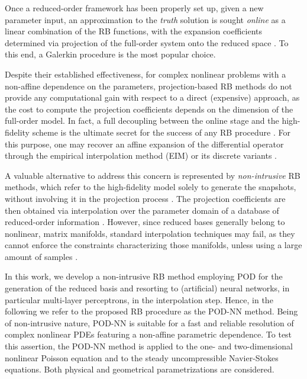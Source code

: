 \documentclass{elsarticle}
\numberwithin{equation}{section}
\theoremstyle{theorem}
\theoremstyle{definition}
\theoremstyle{remark}
\theoremstyle{proposition}
\numberwithin{figure}{section}
\begin{document}
		Once a reduced-order framework has been properly set up, given a new parameter input, an approximation to the \emph{truth} solution is sought \emph{online} as a linear combination of the RB functions, with the expansion coefficients determined via projection of the full-order system onto the reduced space \cite{Buf12}. To this end, a Galerkin procedure is the most popular choice. 
		
		Despite their established effectiveness, for complex nonlinear problems with a non-affine dependence on the parameters, projection-based RB methods do not provide any computational gain with respect to a direct (expensive) approach, as the cost to compute the projection coefficients depends on the dimension of the full-order model. In fact, a full decoupling between the online stage and the high-fidelity scheme is the ultimate secret for the success of any RB procedure \cite{QMN15}. For this purpose, one may recover an affine expansion of the differential operator through the empirical interpolation method (EIM) \cite{Bar04} or its discrete variants \cite{Cha10, NMA15}. 
		
		A valuable alternative to address this concern is represented by \emph{non-intrusive} RB methods, which refer to the high-fidelity model solely to generate the snapshots, without involving it in the projection process \cite{Chen17}. The projection coefficients are then obtained via interpolation over the parameter domain of a database of reduced-order information \cite{Cas15}. However, since reduced bases generally belong to nonlinear, matrix manifolds, standard interpolation techniques may fail, as they cannot enforce the constraints characterizing those manifolds, unless using a large amount of samples \cite{Ams10, BNR00}. 
		
		In this work, we develop a non-intrusive RB method employing POD for the generation of the reduced basis and resorting to (artificial) neural networks, in particular multi-layer perceptrons, in the interpolation step. Hence, in the following we refer to the proposed RB procedure as the POD-NN method. Being of non-intrusive nature, POD-NN is suitable for a fast and reliable resolution of complex nonlinear PDEs featuring a non-affine parametric dependence. To test this assertion, the POD-NN method is applied to the one- and two-dimensional nonlinear Poisson equation and to the steady uncompressible Navier-Stokes equations. Both physical and geometrical parametrizations are considered.
				
\end{document}
